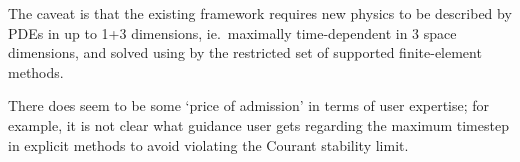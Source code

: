 The caveat is that the existing framework requires new
physics to be described by PDEs in up to 1+3 dimensions, ie.\ maximally time-dependent
in $3$ space dimensions, and
solved using by the restricted set of supported finite-element methods.

There does seem to be some `price of admission' in terms of user expertise; for example, it is not clear what guidance user gets regarding the maximum timestep in explicit methods to avoid violating the Courant stability limit.

%
%



%


